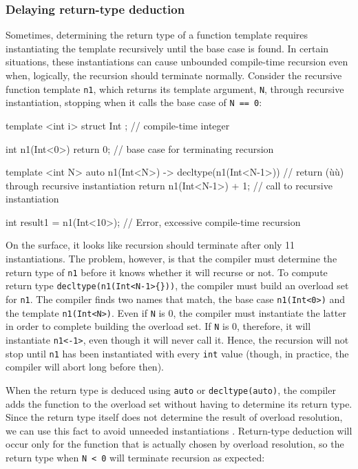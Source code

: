 \subsubsection[Delaying return-type deduction]{Delaying return-type deduction}\label{delaying-return-type-deduction}

Sometimes, determining the return type of a function template requires
instantiating the template recursively until the base case is found. In
certain situations, these instantiations can cause unbounded
compile-time recursion even when, logically, the recursion should
terminate normally. Consider the recursive function template
\lstinline!n1!, which returns its template argument, \lstinline!N!, through
recursive instantiation, stopping when it calls the base case of
\lstinline!N!~\lstinline!==!~\lstinline!0!:

\begin{emcppslisting}[emcppsbatch=e6,emcppsstandards={c++14}]
template <int i>  struct Int{ };  // compile-time integer

int n1(Int<0>) { return 0; }      // base case for terminating recursion

template <int N>
auto n1(Int<N>) -> decltype(n1(Int<N-1>{}))
    // return (ù{}ù) through recursive instantiation
{
    return n1(Int<N-1>{}) + 1;   // call to recursive instantiation
}

int result1 = n1(Int<10>{});     // Error, excessive compile-time recursion
\end{emcppslisting}
    

\noindent On the surface, it looks like recursion should terminate after only 11
instantiations. The problem, however, is that the compiler must
determine the return type of \lstinline!n1! before it knows whether it will
recurse or not. To compute return type
\lstinline!decltype(n1(Int<N-1>{}))!, the compiler must build an overload
set for \lstinline!n1!. The compiler finds two names that match, the base
case \lstinline!n1(Int<0>)! and the template \lstinline!n1(Int<N>)!. Even if
\lstinline!N! is 0, the compiler must instantiate the latter in order to
complete building the overload set. If \lstinline!N! is 0, therefore, it
will instantiate \lstinline!n1<-1>!, even though it will never call it.
Hence, the recursion will not stop until \lstinline!n1! has been
instantiated with every \lstinline!int! value (though, in practice, the
compiler will abort long before then).

When the return type is deduced using \lstinline!auto! or
\lstinline!decltype(auto)!, the compiler adds the function to the overload
set without having to determine its return type. Since the return type
itself does not determine the result of overload resolution, we can use
this fact to avoid unneeded instantiations . Return-type deduction will
occur only for the function that is actually chosen by overload
resolution, so the return type when \lstinline!N!~\lstinline!<!~\lstinline!0!
will terminate recursion as expected:

